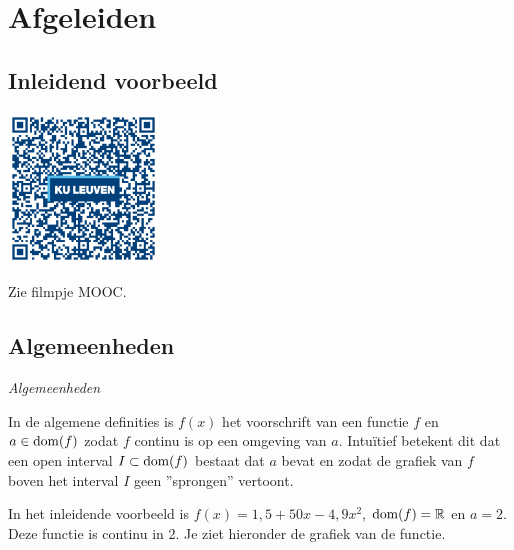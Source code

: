 \section{Afgeleiden}

\subsection{Inleidend voorbeeld}
\begin{minipage}{.25\linewidth}
	\raggedright
	\includegraphics[width=4cm]{6_afgeleiden_integralen/inputs/QR_Code_INLEIDENDVB_module6new}
\end{minipage}
\begin{minipage}{.7\linewidth}
	Zie filmpje MOOC.
\end{minipage}

\subsection{Algemeenheden}

\emph{Algemeenheden}

In de algemene definities is $f(x)$ het voorschrift van een functie $f$ en $a \in \operatorname{dom} (f)$ zodat $f$ continu is op een omgeving van $a$.
Intu\"itief betekent dit dat een open interval $I \subset \operatorname{dom} (f)$ bestaat dat $a$ bevat en zodat de grafiek van $f$ boven het interval $I$ geen ''sprongen'' vertoont.\vspace{5mm}

\begin{voorbeeld}
	In het inleidende voorbeeld is $f(x)=1,5+50 x -4,9 x^2$, $\operatorname{dom} (f)= \mathbb{R}$ en $a=2$.
	Deze functie is continu in 2. Je ziet hieronder de grafiek van de functie.
	\begin{center}
		
	\end{center}
\end{voorbeeld}

